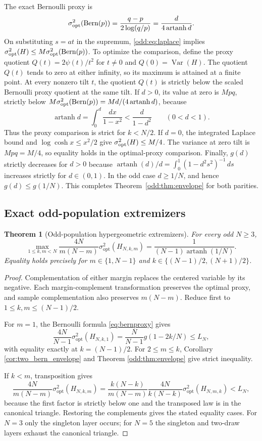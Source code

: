 \documentclass[11pt,a4paper]{article}
\newtheorem{theorem}{Theorem}[section]
\DeclareMathOperator{\Var}{Var}\DeclareMathOperator{\Cov}{Cov}\DeclareMathOperator{\Hyp}{Hyp}\DeclareMathOperator{\Bern}{Bern}\DeclareMathOperator{\supp}{supp}\DeclareMathOperator{\artanh}{artanh}
\begin{document}
The exact Bernoulli proxy is
\begin{equation}\label{odd:eq:bern}
 \sigma^2_{\rm opt}(\Bern(p))=\frac{q-p}{2\log(q/p)}
 =\frac{d}{4\artanh d}.
\end{equation}
On substituting $s=at$ in the supremum, \eqref{odd:eq:laplace} implies
$\sigma^2_{\rm opt}(H)\le M\sigma^2_{\rm opt}(\Bern(p))$.
To optimize the comparison, define the proxy quotient $Q(t)=2\psi(t)/t^2$ for $t\ne0$ and $Q(0)=\Var(H)$. The quotient $Q(t)$ tends to zero at either infinity, so its maximum is attained at a finite point. At every nonzero tilt $t$, the quotient $Q(t)$ is strictly below the scaled Bernoulli proxy quotient at the same tilt. If $d>0$, its value at zero is $Mpq$, strictly below $M\sigma^2_{\rm opt}(\Bern(p))=Md/(4\artanh d)$, because
\[
 \artanh d=\int_0^d\frac{dx}{1-x^2}<\frac{d}{1-d^2}\qquad(0<d<1).
\]
Thus the proxy comparison is strict for $k<N/2$. If $d=0$, the integrated Laplace bound and $\log\cosh x\le x^2/2$ give $\sigma^2_{\rm opt}(H)\le M/4$. The variance at zero tilt is $Mpq=M/4$, so equality holds in the optimal-proxy comparison. Finally, $g(d)$ strictly decreases for $d>0$ because $\operatorname{artanh}(d)/d=\int_0^1(1-d^2s^2)^{-1}\,ds$ increases strictly for $d\in(0,1)$. In the odd case $d\ge1/N$, and hence $g(d)\le g(1/N)$. This completes Theorem~\ref{odd:thm:envelope} for both parities.

\subsection{Exact odd-population extremizers}
\begin{theorem}[Odd-population hypergeometric extremizers]\label{odd:thm:odd}
For every odd $N\ge3$,
\begin{equation}\label{odd:eq:exact}
 \boxed{\quad
 \max_{1\le k,m<N}\frac{4N}{m(N-m)}\sigma^2_{\mathrm{opt}}(H_{N,k,m})
 =\frac{1}{(N-1)\operatorname{artanh}(1/N)}.\quad}
\end{equation}
Equality holds precisely for $m\in\{1,N-1\}$ and $k\in\{(N-1)/2,(N+1)/2\}$.
\end{theorem}
\begin{proof}
Complementation of either margin replaces the centered variable by its negative. Each margin-complement transformation preserves the optimal proxy, and sample complementation also preserves $m(N-m)$. Reduce first to $1\le k,m\le(N-1)/2$.

For $m=1$, the Bernoulli formula \eqref{eq:bernproxy} gives
\[
 \frac{4N}{N-1}\sigma^2_{\mathrm{opt}}(H_{N,k,1})
 =\frac{N}{N-1}g(1-2k/N)\le L_N,
\]
with equality exactly at $k=(N-1)/2$. For $2\le m\le k$, Corollary \ref{cor:two_bern_envelope} and Theorem \ref{odd:thm:envelope} give strict inequality.

If $k<m$, transposition gives
\[
 \frac{4N}{m(N-m)}\sigma^2_{\mathrm{opt}}(H_{N,k,m})
 =\frac{k(N-k)}{m(N-m)}
 \frac{4N}{k(N-k)}\sigma^2_{\mathrm{opt}}(H_{N,m,k})<L_N,
\]
because the first factor is strictly below one and the transposed law is in the canonical triangle. Restoring the complements gives the stated equality cases. For $N=3$ only the singleton layer occurs; for $N=5$ the singleton and two-draw layers exhaust the canonical triangle.
\end{proof}
\end{document}
